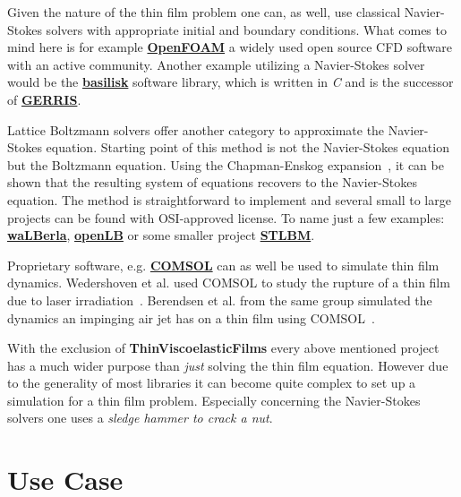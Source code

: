 Given the nature of the thin film problem one can, as well, use classical Navier-Stokes solvers with appropriate initial and boundary conditions.
What comes to mind here is for example \href{https://www.openfoam.com/}{\textbf{OpenFOAM}} a widely used open source CFD software with an active community.
Another example utilizing a Navier-Stokes solver would be the \href{http://basilisk.fr}{\textbf{basilisk}} software library, which is written in \textit{C} and is the successor of \href{http://gfs.sourceforge.net/wiki/index.php/Main_Page}{\textbf{GERRIS}}.

Lattice Boltzmann solvers offer another category to approximate the Navier-Stokes equation.
Starting point of this method is not the Navier-Stokes equation but the Boltzmann equation.
Using the Chapman-Enskog expansion~\cite{Chapman, Enskog}, it can be shown that the resulting system of equations recovers to the Navier-Stokes equation.
The method is straightforward to implement and several small to large projects can be found with OSI-approved license. 
To name just a few examples: \href{https://walberla.net/doxygen/index.html}{\textbf{waLBerla}}, \href{https://www.openlb.net/}{\textbf{openLB}} or some smaller project \href{https://gitlab.com/unigehpfs/stlbm}{\textbf{STLBM}}. 

Proprietary software, e.g. \href{https://www.comsol.com/}{\textbf{COMSOL}} can as well be used to simulate thin film dynamics.
Wedershoven et al. used COMSOL to study the rupture of a thin film due to laser irradiation~\cite{doi:10.1063/1.4863318}.
Berendsen et al. from the same group simulated the dynamics an impinging air jet has on a thin film using COMSOL~\cite{doi:10.1021/la301353f}.

With the exclusion of \textbf{ThinViscoelasticFilms} every above mentioned project has a much wider purpose than \textit{just} solving the thin film equation.
However due to the generality of most libraries it can become quite complex to set up a simulation for a thin film problem.
Especially concerning the Navier-Stokes solvers one uses a \textit{sledge hammer to crack a nut}.

\section{Use Case}

